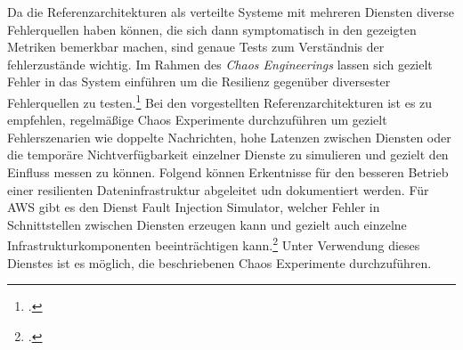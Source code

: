 Da die Referenzarchitekturen als verteilte Systeme mit mehreren Diensten diverse Fehlerquellen haben können, die sich dann symptomatisch in den gezeigten Metriken bemerkbar machen, sind genaue Tests zum Verständnis der fehlerzustände wichtig. Im Rahmen des \textit{Chaos Engineerings} lassen sich gezielt Fehler in das System einführen um die Resilienz gegenüber diversester Fehlerquellen zu testen.\footcite[Vgl.][]{Augsten.2020} Bei den vorgestellten Referenzarchitekturen ist es zu empfehlen, regelmäßige Chaos Experimente durchzuführen um gezielt Fehlerszenarien wie doppelte Nachrichten, hohe Latenzen zwischen Diensten oder die temporäre Nichtverfügbarkeit einzelner Dienste zu simulieren und gezielt den Einfluss messen zu können. Folgend können Erkentnisse für den besseren Betrieb einer resilienten Dateninfrastruktur abgeleitet udn dokumentiert werden. Für \ac{AWS} gibt es den Dienst Fault Injection Simulator, welcher Fehler in Schnittstellen zwischen Diensten erzeugen kann und gezielt auch einzelne Infrastrukturkomponenten beeinträchtigen kann.\footcite[Vgl.][]{Barr.2021b} Unter Verwendung dieses Dienstes ist es möglich, die beschriebenen Chaos Experimente durchzuführen.

